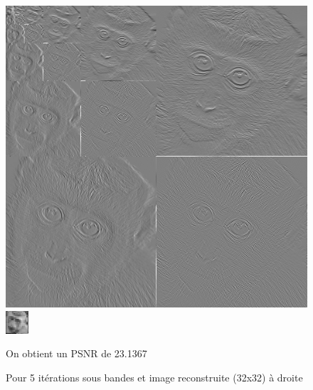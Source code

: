\documentclass{article}
\begin{document}
\begin{figure}[h!]
\centerline{ \includegraphics[scale=0.5]{./rendus/4sousBandes5iterPGM.png} \includegraphics[scale=8]{./rendus/Reconstruite5.png} }
\caption{Pour 5 itérations  sous bandes et image reconstruite (32x32) à droite} 
On obtient un PSNR de 23.1367
\end{figure}
\end{document}
